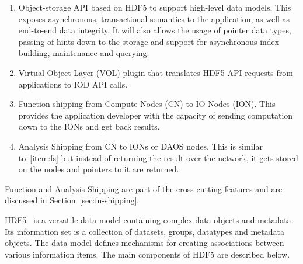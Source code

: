 \documentclass[conference]{IEEEtran}
\begin{document}
\begin{enumerate}
\def\labelenumi{\arabic{enumi}.}
\itemsep1pt\parskip0pt

\item
  Object-storage API based on HDF5 to support high-level data models.
  This exposes asynchronous, transactional semantics to the application,
  as well as end-to-end data integrity. It will also allows the usage of
  pointer data types, passing of hints down to the storage and support
  for asynchronous index building, maintenance and querying.

\item
  Virtual Object Layer (VOL) plugin that translates HDF5 API requests
  from applications to IOD API calls.

\item\label{item:fs}
  Function shipping from Compute Nodes (CN) to IO Nodes (ION). This provides
  the application developer with the capacity of sending computation down to the
  IONs and get back results.

\item
  Analysis Shipping from CN to IONs or DAOS nodes. This is similar
  to~\ref{item:fs} but instead of returning the result over the network, it
  gets stored on the nodes and pointers to it are returned.

\end{enumerate}

Function and Analysis Shipping are part of the cross-cutting features and are
discussed in Section~\ref{sec:fn-shipping}.

HDF5~\cite{hdf5} is a versatile data model containing complex data objects
and metadata. Its information set is a collection of datasets, groups,
datatypes and metadata objects. The data model defines mechanisms for
creating associations between various information items. The main
components of HDF5 are described below.
\end{document}
